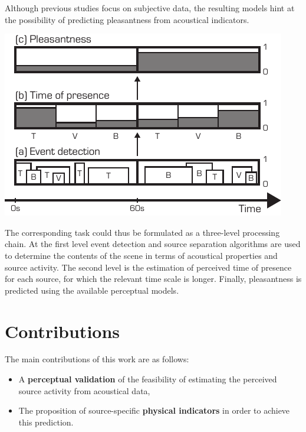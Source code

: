 \documentclass[a0,portrait]{a0poster}
\begin{document}
\begin{multicols}{2}
Although previous studies focus on subjective data, the resulting models hint at the possibility of predicting pleasantness from acoustical indicators.

\begin{center}\vspace{1cm}
\includegraphics[width=0.65\linewidth]{block.pdf}
\end{center}\vspace{1cm}

The corresponding task could thus be formulated as a three-level processing chain. At the first level event detection and source separation algorithms are used to determine the contents of the scene in terms of acoustical properties and source activity. The second level is the estimation of perceived time of presence for each source, for which the relevant time scale is longer. Finally, pleasantness is predicted using the available perceptual models.


\color{DarkSlateGray} %



\section*{Contributions}

The main contributions of this work are as follows:
\begin{itemize}
\item A \textbf{perceptual validation} of the feasibility of estimating the perceived source activity from acoustical data,
\item The proposition of source-specific \textbf{physical indicators} in order to achieve this prediction.
\end{itemize}


\end{multicols}
\end{document}
